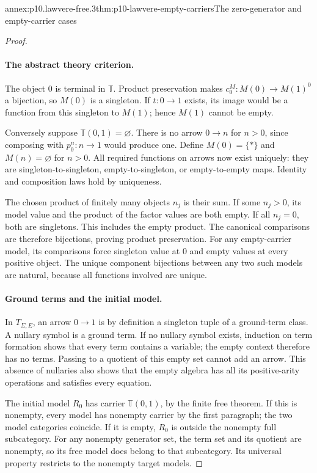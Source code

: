 \begin{annexitem}{annex:p10.lawvere-free.3}{thm:p10-lawvere-empty-carriers}{The zero-generator and empty-carrier cases}
\begin{proof}
\paragraph{The abstract theory criterion.}
The object \(0\) is terminal in \(\mathbb T\).
Product preservation makes \(c_0^M:M(0)\to M(1)^0\) a bijection,
so \(M(0)\) is a singleton.
If \(t:0\to1\) exists, its image would be a function from this
singleton to \(M(1)\); hence \(M(1)\) cannot be empty.

Conversely suppose \(\mathbb T(0,1)=\varnothing\).
There is no arrow \(0\to n\) for \(n>0\), since composing with
\(p_0^n:n\to1\) would produce one.
Define \(M(0)=\{*\}\) and \(M(n)=\varnothing\) for \(n>0\).
All required functions on arrows now exist uniquely: they are
singleton-to-singleton, empty-to-singleton, or empty-to-empty maps.
Identity and composition laws hold by uniqueness.

The chosen product of finitely many objects \(n_j\) is their sum.
If some \(n_j>0\), its model value and the product of the factor
values are both empty. If all \(n_j=0\), both are singletons.
This includes the empty product. The canonical comparisons are
therefore bijections, proving product preservation.
For any empty-carrier model, its comparisons force singleton value
at \(0\) and empty values at every positive object.
The unique component bijections between any two such models are
natural, because all functions involved are unique.

\paragraph{Ground terms and the initial model.}
In \(T_{\Sigma,E}\), an arrow \(0\to1\) is by definition
a singleton tuple of a ground-term class. A nullary symbol is a ground term.
If no nullary symbol exists, induction on term formation shows that
every term contains a variable; the empty context therefore has no
terms. Passing to a quotient of this empty set cannot add an arrow.
This absence of nullaries also shows that the empty algebra
has all its positive-arity operations and satisfies every equation.

The initial model \(R_0\) has carrier \(\mathbb T(0,1)\), by the
finite free theorem. If this is nonempty, every model has nonempty
carrier by the first paragraph; the two model categories coincide.
If it is empty, \(R_0\) is outside the nonempty full subcategory.
For any nonempty generator set, the term set and its quotient are
nonempty, so its free model does belong to that subcategory.
Its universal property restricts to the nonempty target models.


\end{proof}
\end{annexitem}
